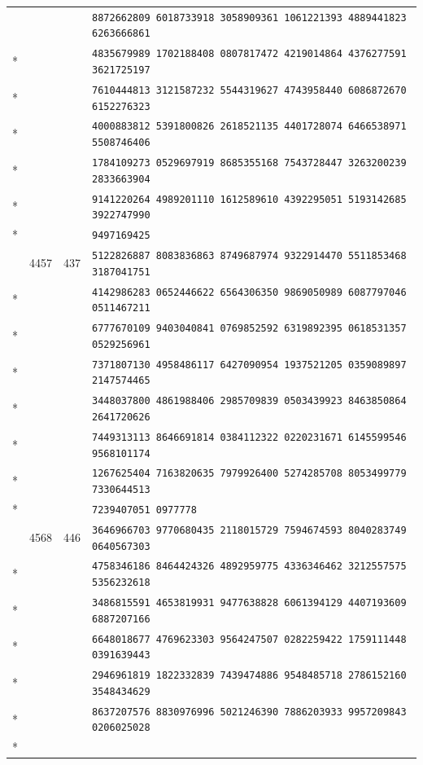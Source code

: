 \documentclass[10pt]{article}
\begin{document}
\begin{longtable}{@{}r@{\quad}r@{\quad}r@{\quad}l@{}}
 & &  & \texttt{8872662809 6018733918 3058909361 1061221393 4889441823 6263666861}\\*
 & &  & \texttt{4835679989 1702188408 0807817472 4219014864 4376277591 3621725197}\\*
 & &  & \texttt{7610444813 3121587232 5544319627 4743958440 6086872670 6152276323}\\*
 & &  & \texttt{4000883812 5391800826 2618521135 4401728074 6466538971 5508746406}\\*
 & &  & \texttt{1784109273 0529697919 8685355168 7543728447 3263200239 2833663904}\\*
 & &  & \texttt{9141220264 4989201110 1612589610 4392295051 5193142685 3922747990}\\*
 & &  & \texttt{9497169425}\\
\addlinespace[2pt]
86 & 4457 & 437 & \texttt{5122826887 8083836863 8749687974 9322914470 5511853468 3187041751}\\*
 & &  & \texttt{4142986283 0652446622 6564306350 9869050989 6087797046 0511467211}\\*
 & &  & \texttt{6777670109 9403040841 0769852592 6319892395 0618531357 0529256961}\\*
 & &  & \texttt{7371807130 4958486117 6427090954 1937521205 0359089897 2147574465}\\*
 & &  & \texttt{3448037800 4861988406 2985709839 0503439923 8463850864 2641720626}\\*
 & &  & \texttt{7449313113 8646691814 0384112322 0220231671 6145599546 9568101174}\\*
 & &  & \texttt{1267625404 7163820635 7979926400 5274285708 8053499779 7330644513}\\*
 & &  & \texttt{7239407051 0977778}\\
\addlinespace[2pt]
87 & 4568 & 446 & \texttt{3646966703 9770680435 2118015729 7594674593 8040283749 0640567303}\\*
 & &  & \texttt{4758346186 8464424326 4892959775 4336346462 3212557575 5356232618}\\*
 & &  & \texttt{3486815591 4653819931 9477638828 6061394129 4407193609 6887207166}\\*
 & &  & \texttt{6648018677 4769623303 9564247507 0282259422 1759111448 0391639443}\\*
 & &  & \texttt{2946961819 1822332839 7439474886 9548485718 2786152160 3548434629}\\*
 & &  & \texttt{8637207576 8830976996 5021246390 7886203933 9957209843 0206025028}\\*

\end{longtable}
\end{document}
